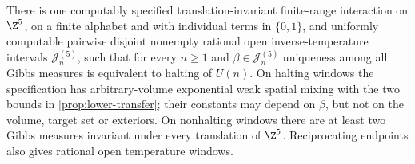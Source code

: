 \begin{corollary}\label{cor:lower-gibbs}
There is one computably specified translation-invariant finite-range interaction on $\Z^5$, on a finite alphabet and with individual terms in $\{0,1\}$, and uniformly computable pairwise disjoint nonempty rational open inverse-temperature intervals $\mathcal J_n^{(5)}$, such that for every $n\ge1$ and $\beta\in\mathcal J_n^{(5)}$ uniqueness among all Gibbs measures is equivalent to halting of $U(n)$. On halting windows the specification has arbitrary-volume exponential weak spatial mixing with the two bounds in \cref{prop:lower-transfer}; their constants may depend on $\beta$, but not on the volume, target set or exteriors. On nonhalting windows there are at least two Gibbs measures invariant under every translation of $\Z^5$. Reciprocating endpoints also gives rational open temperature windows.
\end{corollary}
